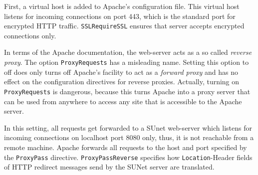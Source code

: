 First, a virtual host is added to Apache's configuration file.  This
virtual host listens for incoming connections on port 443, which is
the standard port for encrypted HTTP traffic.  \texttt{SSLRequireSSL}
ensures that server accepts encrypted connections only.

In terms of the Apache documentation, the web-server acts as a so
called \textit{reverse proxy}.  The option \texttt{ProxyRequests} has
a misleading name.  Setting this option to off does only turns off
Apache's facility to act as a \textit{forward proxy} and has no effect
on the configuration directives for reverse proxies.  Actually,
turning on \texttt{ProxyRequests} is dangerous, because this turns
Apache into a proxy server that can be used from anywhere to access
any site that is accessible to the Apache server.

In this setting, all requests get forwarded to a SUnet web-server
which listens for incoming connections on localhost port 8080 only,
thus, it is not reachable from a remote machine.  Apache forwards all
requests to the host and port specified by the \texttt{ProxyPass}
directive.  \texttt{ProxyPassReverse} specifies how
\texttt{Location}-Header fields of HTTP redirect messages send by the
SUNet server are translated.

